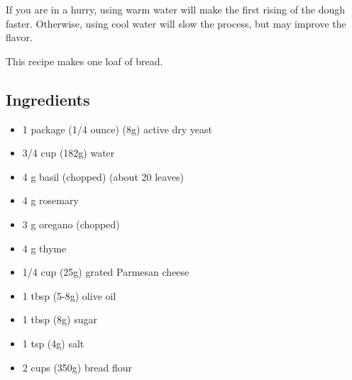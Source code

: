 \documentclass[10pt, openany]{book}
\begin{document}
If you are in a hurry, using warm water will make the first rising of the dough faster.  Otherwise, using cool water will slow the process, but may improve the flavor.

This recipe makes one loaf of bread.

\subsection{Ingredients}
\begin{itemize}
  \item 1 package (1/4 ounce) (8g) active dry yeast
  \item 3/4 cup (182g) water
  \item 4 g basil (chopped) (about 20 leaves)
  \item 4 g rosemary
  \item 3 g oregano (chopped)
  \item 4 g thyme
  \item 1/4 cup (25g) grated Parmesan cheese
  \item 1 tbsp (5-8g) olive oil
  \item 1 tbsp (8g) sugar
  \item 1 tsp (4g) salt
  \item 2 cups (350g) bread flour
\end{itemize}
\end{document}
